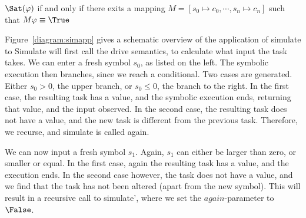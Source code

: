 \begin{figure*}
\caption{Application of the simulation function to Example~\ref{example:abs}}
\label{diagram:simapp}
\end{figure*}

\begin{definition}
  \label{def:Sat}
  $\Sat(\phi)$ if and only if there exits a mapping $M=[s_0\mapsto c_0,\cdots,s_n\mapsto c_n]$ such that $M\phi\equiv\True$
\end{definition}

Figure~\ref{diagram:simapp} gives a schematic overview of the application of simulate to
Simulate will first call the drive semantics, to calculate what input the task takes.
We can enter a fresh symbol $s_0$, as listed on the left.
The symbolic execution then branches, since we reach a conditional.
Two cases are generated. Either $s_0>0$, the upper branch, or $s_0\leq0$, the  branch to the right.
In the first case, the resulting task has a value, and the symbolic execution ends, returning that value, and the input observed.
In the second case, the resulting task does not have a value, and the new task is different from the previous task.
Therefore, we recurse, and simulate is called again.

We can now input a fresh symbol $s_1$. Again, $s_1$ can either be larger than zero, or smaller or equal.
In the first case, again the resulting task has a value, and the execution ends.
In the second case however, the task does not have a value, and we find that the task has not been altered (apart from the new symbol).
This will result in a recursive call to simulate', where we set the $\mathit{again}$-parameter to $\False$.

